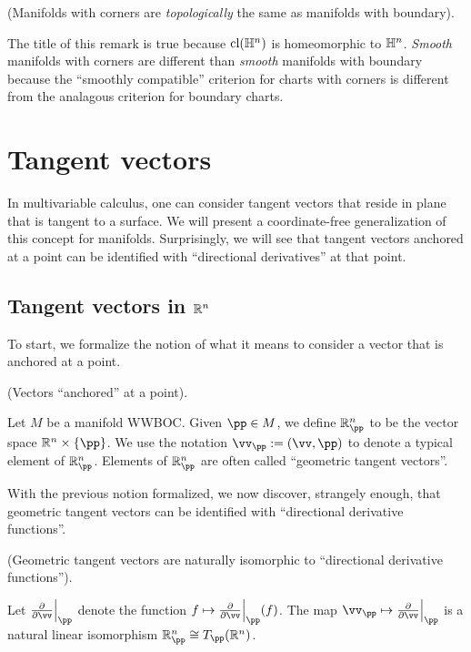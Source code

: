 \begin{remark}
     (Manifolds with corners are \textit{topologically} the same as manifolds with boundary).
    
    The title of this remark is true because $\text{cl}(\mathbb{H}^n)$ is homeomorphic to $\mathbb{H}^n$. \textit{Smooth} manifolds with corners are different than \textit{smooth} manifolds with boundary because the ``smoothly compatible'' criterion for charts with corners is different from the analagous criterion for boundary charts.
\end{remark}

\newpage

\section{Tangent vectors}

In multivariable calculus, one can consider tangent vectors that reside in plane that is tangent to a surface. We will present a coordinate-free generalization of this concept for manifolds. Surprisingly, we will see that tangent vectors anchored at a point can be identified with ``directional derivatives'' at that point.

\subsection*{Tangent vectors in $\mathbb{R}^n$}

To start, we formalize the notion of what it means to consider a vector that is anchored at a point.

\begin{defn}
     (Vectors ``anchored'' at a point).
    
    Let $M$ be a manifold WWBOC. Given $\pp \in M$, we define $\R^n_\pp$ to be the vector space $\R^n \times \{\pp\}$. We use the notation $\vv_\pp := (\vv, \pp)$ to denote a typical element of $\R^n_\pp$. Elements of $\R^n_\pp$ are often called ``geometric tangent vectors''.
\end{defn}

With the previous notion formalized, we now discover, strangely enough, that geometric tangent vectors can be identified with ``directional derivative functions''.

\begin{theorem}
    \label{ch::manifolds::thm::geometric_tangent_vectors_iso_directional_derivative_functions}
    (Geometric tangent vectors are naturally isomorphic to ``directional derivative functions'').
    
     Let $\frac{\pd}{\pd \vv}\Big|_\pp$ denote the function $f \mapsto \frac{\pd}{\pd \vv}\Big|_\pp (f)$. The map $\vv_\pp \mapsto \frac{\pd}{\pd \vv}\Big|_\pp$ is a natural linear isomorphism $\R^n_\pp \cong T_\pp(\R^n)$.
\end{theorem}

